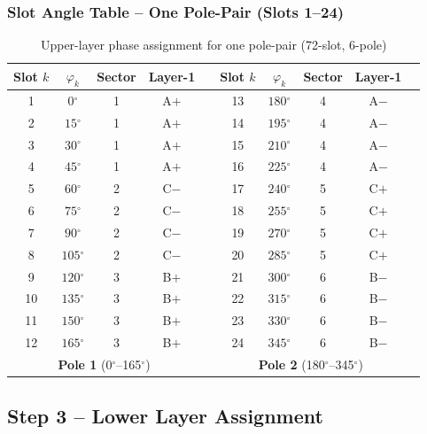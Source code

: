 \documentclass[12pt,a4paper]{article}
\newcommand{\degree}{\ensuremath{^{\circ}}}
\begin{document}
\subsubsection{Slot Angle Table -- One Pole-Pair (Slots 1--24)}

\begin{table}[H]
  \centering
  \caption{Upper-layer phase assignment for one pole-pair (72-slot, 6-pole)}
  \label{tab:q1_upper}
  \begin{tabular}{ccccc|ccccc}
    \toprule
    Slot $k$ & $\varphi_k$ & Sector & Layer-1 &&
    Slot $k$ & $\varphi_k$ & Sector & Layer-1 \\
    \midrule
    1  & $0\degree$   & 1 & A$+$ && 13 & $180\degree$ & 4 & A$-$ \\
    2  & $15\degree$  & 1 & A$+$ && 14 & $195\degree$ & 4 & A$-$ \\
    3  & $30\degree$  & 1 & A$+$ && 15 & $210\degree$ & 4 & A$-$ \\
    4  & $45\degree$  & 1 & A$+$ && 16 & $225\degree$ & 4 & A$-$ \\
    5  & $60\degree$  & 2 & C$-$ && 17 & $240\degree$ & 5 & C$+$ \\
    6  & $75\degree$  & 2 & C$-$ && 18 & $255\degree$ & 5 & C$+$ \\
    7  & $90\degree$  & 2 & C$-$ && 19 & $270\degree$ & 5 & C$+$ \\
    8  & $105\degree$ & 2 & C$-$ && 20 & $285\degree$ & 5 & C$+$ \\
    9  & $120\degree$ & 3 & B$+$ && 21 & $300\degree$ & 6 & B$-$ \\
    10 & $135\degree$ & 3 & B$+$ && 22 & $315\degree$ & 6 & B$-$ \\
    11 & $150\degree$ & 3 & B$+$ && 23 & $330\degree$ & 6 & B$-$ \\
    12 & $165\degree$ & 3 & B$+$ && 24 & $345\degree$ & 6 & B$-$ \\
    \midrule
    \multicolumn{4}{c}{\textbf{Pole 1} (0\degree--165\degree)} &&
    \multicolumn{4}{c}{\textbf{Pole 2} (180\degree--345\degree)} \\
    \bottomrule
  \end{tabular}
\end{table}



\subsection{Step 3 -- Lower Layer Assignment}
\end{document}
